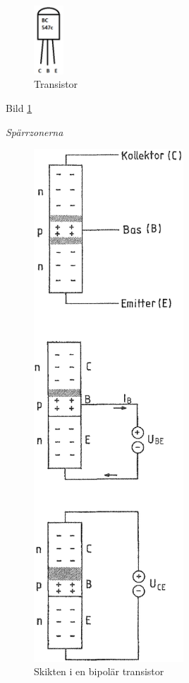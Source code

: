 \begin{figure}
\begin{center}
\includegraphics[width=0.1\textwidth]{images/cropped_pdfs/bild_2_6-37.pdf}
\end{center}
\caption{Transistor}
\label{fig:BildII2-17a}
\end{figure}

Bild \ref{fig:BildII2-17a}

\emph{Spärrzonerna}

\begin{figure}
\includegraphics[width=0.5\textwidth]{images/cropped_pdfs/bild_2_2-17.pdf}
\caption{Skikten i en bipolär transistor}
\label{fig:BildII2-17}
\end{figure}

